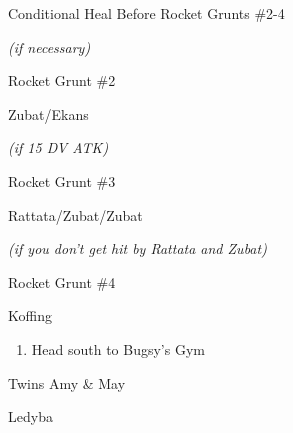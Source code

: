\begin{paracol}{2}
\switchcolumn
\begin{menu}{Conditional Heal Before Rocket Grunts \#2-4}
	\varwb
	\begin{packMenu}
		\item \textbf{\potion{}} \textit{(if necessary)}
	\end{packMenu}
	\varwe
\end{menu}

\switchcolumn
\begin{trainer}{Rocket Grunt \#2}
	\varwb
	\begin{fightSection}{Zubat/Ekans}
		\item {} \waterGun
		\begin{notes}
			\small{\item {} \scratch{} \textit{(if 15 DV ATK)}}
		\end{notes}
	\end{fightSection}
	\varwe
\end{trainer}

\begin{trainer}{Rocket Grunt \#3}
	\varwb
	\begin{fightSection}{Rattata/Zubat/Zubat}
		\item {} \rage
		\begin{notes}
			\small{\item {} \waterGun{} \textit{(if you don't get hit by Rattata and Zubat)}}
		\end{notes}
	\end{fightSection}
	\varwe
\end{trainer}

\begin{trainer}{Rocket Grunt \#4}
	\varwb
	\begin{fightSection}{Koffing}
		\item {} \waterGun{}
	\end{fightSection}
	\varwe
\end{trainer}

\begin{enumerate}[resume]
	\item Head south to Bugsy's Gym
\end{enumerate}

\switchcolumn*
\begin{trainer}{Twins Amy \& May}
	\varwb
	\begin{notes}
		\item \trainerHlTwo{Otherwise}
	\end{notes}
	\begin{fightSection}{Ledyba}
		\item {} \scratch{} \trainerHlTwo{2x}
	\end{fightSection}
	\varwe
\end{trainer}


\end{paracol}

